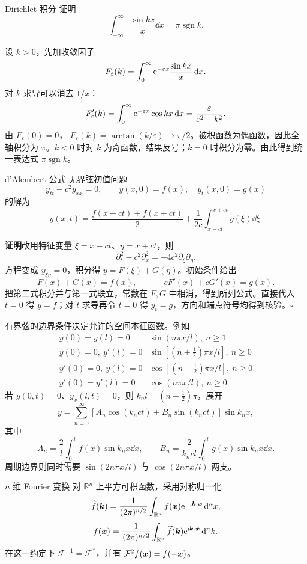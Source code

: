 \begin{advexamplebox}{Dirichlet 积分}\label{advA3:ex:dirichlet-integral}
证明
\[
 \int_{-\infty}^{\infty}\frac{\sin kx}{x}\dd x=\pi\operatorname{sgn}k.
\]

\AQDirichlet
\end{advexamplebox}
\begin{advsolution}
\AADirichlet

设 $k>0$，先加收敛因子
\[
 F_\varepsilon(k)=\int_0^\infty\mathrm e^{-\varepsilon x}
 \frac{\sin kx}{x}\mathop{}\!\mathrm d x.
\]
对 $k$ 求导可以消去 $1/x$：
\[
 F_\varepsilon'(k)=\int_0^\infty\mathrm e^{-\varepsilon x}\cos kx\mathop{}\!\mathrm d x
 =\frac{\varepsilon}{\varepsilon^2+k^2}.
\]
由 $F_\varepsilon(0)=0$，
$F_\varepsilon(k)=\arctan(k/\varepsilon)\to\pi/2$。被积函数为偶函数，因此全轴积分为 $\pi$。$k<0$ 时对 $k$ 为奇函数，结果反号；$k=0$ 时积分为零。由此得到统一表达式 $\pi\operatorname{sgn}k$。
\end{advsolution}

\begin{advtheorem}{d'Alembert 公式}\label{advA3:thm:dalembert}
无界弦初值问题
\[
 y_{tt}-c^2y_{xx}=0,\qquad y(x,0)=f(x),\quad y_t(x,0)=g(x)
\]
的解为
\[
 \boxed{y(x,t)=\frac{f(x-ct)+f(x+ct)}2
 +\frac1{2c}\int_{x-ct}^{x+ct}g(\xi)\dd\xi}.
\]
\end{advtheorem}
\noindent\textbf{证明}\quad 改用特征变量 $\xi=x-ct$、$\eta=x+ct$，则
\[
 \partial_t^2-c^2\partial_x^2=-4c^2\partial_\xi\partial_\eta.
\]
方程变成 $y_{\xi\eta}=0$，积分得 $y=F(\xi)+G(\eta)$。初始条件给出
\[
 F(x)+G(x)=f(x),\qquad -cF'(x)+cG'(x)=g(x).
\]
把第二式积分并与第一式联立，常数在 $F,G$ 中相消，得到所列公式。直接代入 $t=0$ 得 $y=f$；对 $t$ 求导再令 $t=0$ 得 $y_t=g$，方向和端点符号均得到核验。\hfill$\square$

有界弦的边界条件决定允许的空间本征函数。例如
\[
\begin{array}{c|c}
y(0)=y(l)=0&\sin(n\pi x/l),\ n\ge1\\
y(0)=0,\ y'(l)=0&\sin[(n+\tfrac12)\pi x/l],\ n\ge0\\
y'(0)=0,\ y(l)=0&\cos[(n+\tfrac12)\pi x/l],\ n\ge0\\
y'(0)=y'(l)=0&\cos(n\pi x/l),\ n\ge0
\end{array}
\]
若 $y(0,t)=0$、$y_x(l,t)=0$，则 $k_nl=(n+\tfrac12)\pi$，展开
\[
 y=\sum_{n=0}^\infty[A_n\cos(k_nct)+B_n\sin(k_nct)]\sin k_nx,
\]
其中
\[
 A_n=\frac2l\int_0^lf(x)\sin k_nx\dd x,\qquad
 B_n=\frac2{k_ncl}\int_0^lg(x)\sin k_nx\dd x.
\]
周期边界则同时需要 $\sin(2n\pi x/l)$ 与 $\cos(2n\pi x/l)$ 两支。

\begin{advdefinition}{$n$ 维 Fourier 变换}\label{advA3:def:nd-fourier}
对 $\mathbb R^n$ 上平方可积函数，采用对称归一化
\[
 \widetilde f(\bm{k})=\frac1{(2\pi)^{n/2}}
 \int_{\mathbb R^n}f(\bm{x})\mathrm e^{-\mathrm i\bm{k}\cdot\bm{x}}\mathop{}\!\mathrm d^n x,
\]
\[
 f(\bm{x})=\frac1{(2\pi)^{n/2}}
 \int_{\mathbb R^n}\widetilde f(\bm{k})\mathrm e^{\mathrm i\bm{k}\cdot\bm{x}}\mathop{}\!\mathrm d^n k.
\]
在这一约定下 $\mathcal F^{-1}=\mathcal F^*$，并有
$\mathcal F^2f(\bm{x})=f(-\bm{x})$。
\end{advdefinition}

